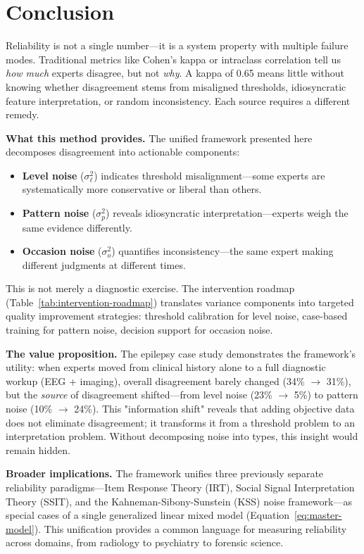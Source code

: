 \documentclass[num-refs]{wiley-article}
\begin{document}
\section*{Conclusion}

Reliability is not a single number---it is a system property with multiple failure modes. Traditional metrics like Cohen's kappa or intraclass correlation tell us \textit{how much} experts disagree, but not \textit{why}. A kappa of 0.65 means little without knowing whether disagreement stems from misaligned thresholds, idiosyncratic feature interpretation, or random inconsistency. Each source requires a different remedy.

\textbf{What this method provides.} The unified framework presented here decomposes disagreement into actionable components:
\begin{itemize}
    \item \textbf{Level noise} ($\sigma_\ell^2$) indicates threshold misalignment---some experts are systematically more conservative or liberal than others.
    \item \textbf{Pattern noise} ($\sigma_p^2$) reveals idiosyncratic interpretation---experts weigh the same evidence differently.
    \item \textbf{Occasion noise} ($\sigma_o^2$) quantifies inconsistency---the same expert making different judgments at different times.
\end{itemize}

This is not merely a diagnostic exercise. The intervention roadmap (Table~\ref{tab:intervention-roadmap}) translates variance components into targeted quality improvement strategies: threshold calibration for level noise, case-based training for pattern noise, decision support for occasion noise.

\textbf{The value proposition.} The epilepsy case study demonstrates the framework's utility: when experts moved from clinical history alone to a full diagnostic workup (EEG + imaging), overall disagreement barely changed (34\% $\rightarrow$ 31\%), but the \textit{source} of disagreement shifted---from level noise (23\% $\rightarrow$ 5\%) to pattern noise (10\% $\rightarrow$ 24\%). This "information shift" reveals that adding objective data does not eliminate disagreement; it transforms it from a threshold problem to an interpretation problem. Without decomposing noise into types, this insight would remain hidden.

\textbf{Broader implications.} The framework unifies three previously separate reliability paradigms---Item Response Theory (IRT), Social Signal Interpretation Theory (SSIT), and the Kahneman-Sibony-Sunstein (KSS) noise framework---as special cases of a single generalized linear mixed model (Equation~\ref{eq:master-model}). This unification provides a common language for measuring reliability across domains, from radiology to psychiatry to forensic science.
\end{document}
